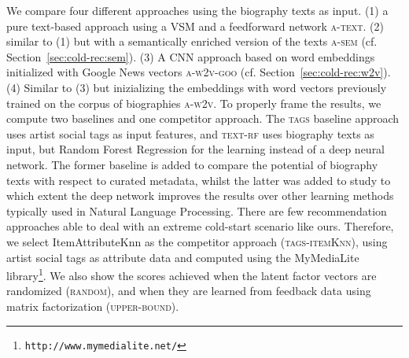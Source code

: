 We compare four different approaches using the biography texts as input. (1) a pure text-based approach using a VSM and a feedforward network \textsc{a-text}. (2) similar to (1) but with a semantically enriched version of the texts \textsc{a-sem} (cf. Section~\ref{sec:cold-rec:sem}). (3) A CNN approach based on word embeddings initialized with Google News vectors \textsc{a-w2v-goo} (cf. Section~\ref{sec:cold-rec:w2v}). (4) Similar to (3) but inizializing the embeddings with word vectors previously trained on the corpus of biographies \textsc{a-w2v}. To properly frame the results, we compute two baselines and one competitor approach. The \textsc{tags} baseline approach uses artist social tags as input features, and \textsc{text-rf} uses biography texts as input, but Random Forest Regression for the learning instead of a deep neural network. The former baseline is added to compare the potential of biography texts with respect to curated metadata, whilst the latter was added to study to which extent the deep network improves the results over other learning methods typically used in Natural Language Processing. There are few recommendation approaches able to deal with an extreme cold-start scenario like ours. Therefore, we select ItemAttributeKnn \citep{GantnerDFRS10} as the competitor approach (\textsc{tags-itemKnn}), using artist social tags as attribute data and computed using the MyMediaLite library\footnote{\texttt{http://www.mymedialite.net/}}. %
We also show the scores achieved when the latent factor vectors are randomized (\textsc{random}), and when they are learned from feedback data using matrix factorization (\textsc{upper-bound}).

